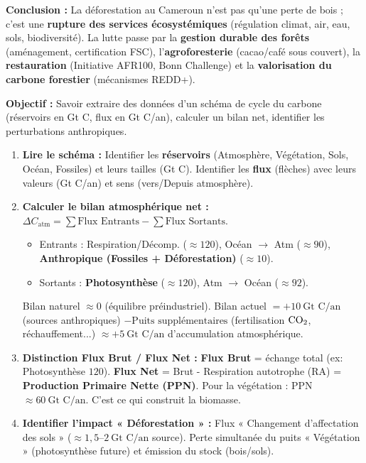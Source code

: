 \documentclass[11pt]{article}
\begin{document}
\begin{exoresolu}
    \textbf{Conclusion :} La déforestation au Cameroun n'est pas qu'une perte de bois ; c'est une \textbf{rupture des services écosystémiques} (régulation climat, air, eau, sols, biodiversité). La lutte passe par la \textbf{gestion durable des forêts} (aménagement, certification FSC), l'\textbf{agroforesterie} (cacao/café sous couvert), la \textbf{restauration} (Initiative AFR100, Bonn Challenge) et la \textbf{valorisation du carbone forestier} (mécanismes REDD+).
\end{exoresolu}

\begin{methode}
    \textbf{Objectif :} Savoir extraire des données d'un schéma de cycle du carbone (réservoirs en Gt C, flux en Gt C/an), calculer un bilan net, identifier les perturbations anthropiques.
    \begin{enumerate}
        \item \textbf{Lire le schéma :} Identifier les \textbf{réservoirs} (Atmosphère, Végétation, Sols, Océan, Fossiles) et leurs tailles (Gt C). Identifier les \textbf{flux} (flèches) avec leurs valeurs (Gt C/an) et sens (vers/Depuis atmosphère).
        \item \textbf{Calculer le bilan atmosphérique net :} $\Delta C_{\text{atm}} = \sum \text{Flux Entrants} - \sum \text{Flux Sortants}$.
            \begin{itemize}
                \item Entrants : Respiration/Décomp. ($\approx 120$), Océan $\rightarrow$ Atm ($\approx 90$), \textbf{Anthropique (Fossiles + Déforestation)} ($\approx 10$).
                \item Sortants : \textbf{Photosynthèse} ($\approx 120$), Atm $\rightarrow$ Océan ($\approx 92$).
            \end{itemize}
            Bilan naturel $\approx 0$ (équilibre préindustriel). Bilan actuel $= +10\ \text{Gt C/an}$ (sources anthropiques) $- \text{Puits supplémentaires}$ (fertilisation $\ce{CO2}$, réchauffement...) $\approx +5\ \text{Gt C/an}$ d'accumulation atmosphérique.
        \item \textbf{Distinction Flux Brut / Flux Net :} \textbf{Flux Brut} = échange total (ex: Photosynthèse $120$). \textbf{Flux Net} = Brut - Respiration autotrophe (RA) = \textbf{Production Primaire Nette (PPN)}. Pour la végétation : PPN $\approx 60\ \text{Gt C/an}$. C'est ce qui construit la biomasse.
        \item \textbf{Identifier l'impact « Déforestation » :} Flux « Changement d'affectation des sols » ($\approx 1,5$--$2\ \text{Gt C/an}$ source). Perte simultanée du puits « Végétation » (photosynthèse future) et émission du stock (bois/sols).

\end{enumerate}
\end{methode}
\end{document}
